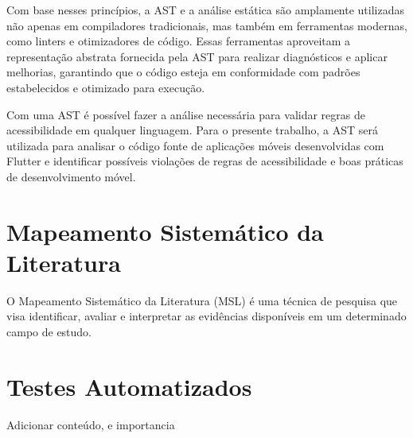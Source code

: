 Com base nesses princípios, a AST e a análise estática são amplamente utilizadas não apenas em compiladores tradicionais, mas também em ferramentas modernas, como linters e otimizadores de código. Essas ferramentas aproveitam a representação abstrata fornecida pela AST para realizar diagnósticos e aplicar melhorias, garantindo que o código esteja em conformidade com padrões estabelecidos e otimizado para execução.

Com uma AST é possível fazer a análise necessária para validar regras de acessibilidade em qualquer linguagem. Para o presente trabalho, a AST será utilizada para analisar o código fonte de aplicações móveis desenvolvidas com Flutter e identificar possíveis violações de regras de acessibilidade e boas práticas de desenvolvimento móvel.

\section{Mapeamento Sistemático da Literatura}

O Mapeamento Sistemático da Literatura (MSL) é uma técnica de pesquisa que visa identificar, avaliar e interpretar as evidências disponíveis em um determinado campo de estudo.

\section{Testes Automatizados}

Adicionar conteúdo, e importancia